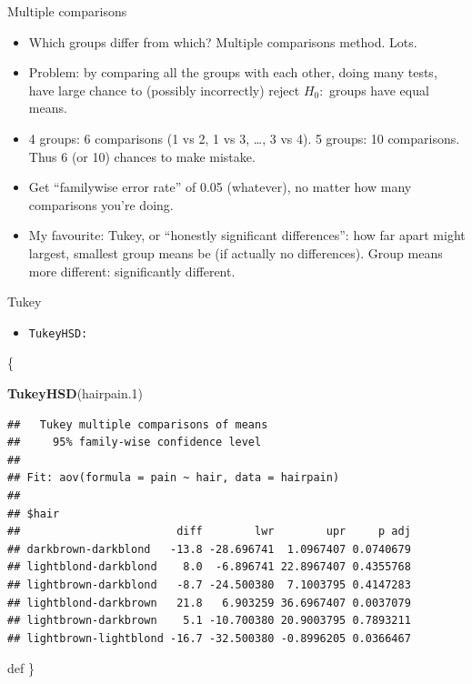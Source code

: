 \documentclass[ignorenonframetext,]{beamer}
\newenvironment{Shaded}{\begin{snugshade}}{\end{snugshade}}
\newcommand{\FloatTok}[1]{\textcolor[rgb]{0.00,0.00,0.81}{#1}}
\newcommand{\KeywordTok}[1]{\textcolor[rgb]{0.13,0.29,0.53}{\textbf{#1}}}
\newcommand{\NormalTok}[1]{#1}
\providecommand{\tightlist}{%
  \setlength{\itemsep}{0pt}\setlength{\parskip}{0pt}}
\begin{document}
\begin{frame}{Multiple comparisons}
\protect\hypertarget{multiple-comparisons}{}

\begin{itemize}
\item
  Which groups differ from which? Multiple comparisons method. Lots.
\item
  Problem: by comparing all the groups with each other, doing many
  tests, have large chance to (possibly incorrectly) reject \(H_0:\)
  groups have equal means.
\item
  4 groups: 6 comparisons (1 vs 2, 1 vs 3, \ldots, 3 vs 4). 5 groups: 10
  comparisons. Thus 6 (or 10) chances to make mistake.
\item
  Get ``familywise error rate'' of 0.05 (whatever), no matter how many
  comparisons you're doing.
\item
  My favourite: Tukey, or ``honestly significant differences'': how far
  apart might largest, smallest group means be (if actually no
  differences). Group means more different: significantly different.
\end{itemize}

\end{frame}

\begin{frame}[fragile]{Tukey}
\protect\hypertarget{tukey}{}

\begin{itemize}
\tightlist
\item
  \texttt{TukeyHSD:}
\end{itemize}

\{\footnotesize

\begin{Shaded}
\begin{Highlighting}[]
\KeywordTok{TukeyHSD}\NormalTok{(hairpain}\FloatTok{.1}\NormalTok{)}
\end{Highlighting}
\end{Shaded}

\begin{verbatim}
##   Tukey multiple comparisons of means
##     95% family-wise confidence level
## 
## Fit: aov(formula = pain ~ hair, data = hairpain)
## 
## $hair
##                        diff        lwr        upr     p adj
## darkbrown-darkblond   -13.8 -28.696741  1.0967407 0.0740679
## lightblond-darkblond    8.0  -6.896741 22.8967407 0.4355768
## lightbrown-darkblond   -8.7 -24.500380  7.1003795 0.4147283
## lightblond-darkbrown   21.8   6.903259 36.6967407 0.0037079
## lightbrown-darkbrown    5.1 -10.700380 20.9003795 0.7893211
## lightbrown-lightblond -16.7 -32.500380 -0.8996205 0.0366467
\end{verbatim}

def \}

\end{frame}
\end{document}
